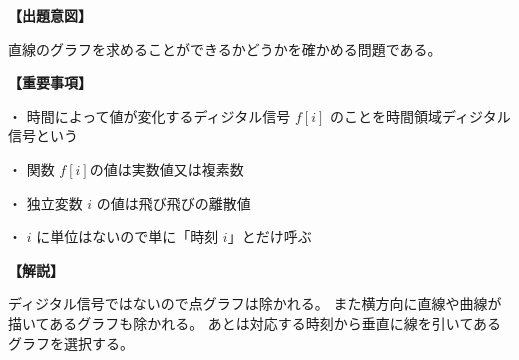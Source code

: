 \noindent \textbf{【出題意図】}

\noindent 直線のグラフを求めることができるかどうかを確かめる問題である。

\vspace{1em}
\noindent \textbf{【重要事項】}

\bigskip
\noindent ・ 時間によって値が変化するディジタル信号 $f[i]$ のことを時間領域ディジタル信号という

\bigskip
\noindent ・ 関数 $f[i]$の値は実数値又は複素数

\bigskip
\noindent ・ 独立変数 $i$ の値は飛び飛びの離散値

\bigskip
\noindent ・ $i$ に単位はないので単に「時刻 $i$」とだけ呼ぶ


\vspace{1em}
\noindent \textbf{【解説】}

\noindent ディジタル信号ではないので点グラフは除かれる。
また横方向に直線や曲線が描いてあるグラフも除かれる。
あとは対応する時刻から垂直に線を引いてあるグラフを選択する。
